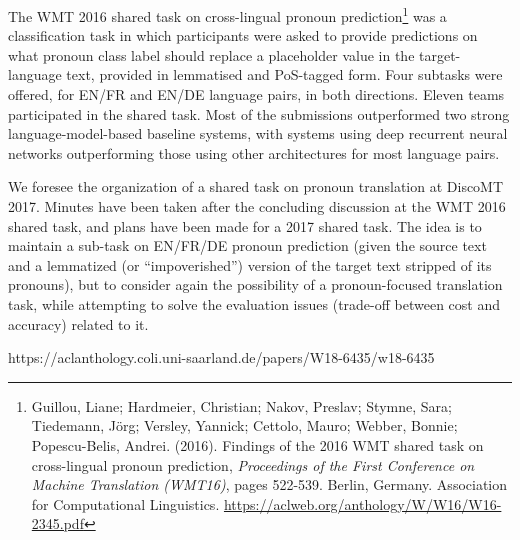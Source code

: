 \documentclass[11pt]{article}
\begin{document}
The WMT 2016 shared task on cross-lingual pronoun prediction\footnote{Guillou, Liane; Hardmeier, Christian; Nakov, Preslav; Stymne, Sara; Tiedemann, Jörg; Versley, Yannick; Cettolo, Mauro; Webber, Bonnie; Popescu-Belis, Andrei. (2016).  Findings of the 2016 WMT shared task on cross-lingual pronoun prediction, \textit{Proceedings of the First Conference on Machine Translation (WMT16)}, pages 522-539.  Berlin, Germany. Association for Computational Linguistics. \url{https://aclweb.org/anthology/W/W16/W16-2345.pdf}}
was a  classification  task  in which  participants  were  asked  to  provide predictions  on  what  pronoun  class  label should replace a placeholder value in the target-language  text,  provided  in  lemmatised and PoS-tagged form.  Four subtasks were offered, for EN/FR and EN/DE language  pairs,  in  both directions.   Eleven  teams  participated  in the  shared  task. Most of the submissions outperformed two strong language-model-based baseline systems, with systems using deep recurrent neural networks outperforming those using other architectures for most language pairs.

We foresee the organization of a shared task on pronoun translation at DiscoMT 2017.  Minutes have been taken after the concluding discussion at the WMT 2016 shared task, and plans have been made for a 2017 shared task.  The idea is to maintain a sub-task on EN/FR/DE pronoun prediction (given the source text and a lemmatized (or ``impoverished'') version of the target text stripped of its pronouns), but to consider again the possibility of a pronoun-focused translation task, while attempting to solve the evaluation issues (trade-off between cost and accuracy) related to it.

https://aclanthology.coli.uni-saarland.de/papers/W18-6435/w18-6435 %
\end{document}
